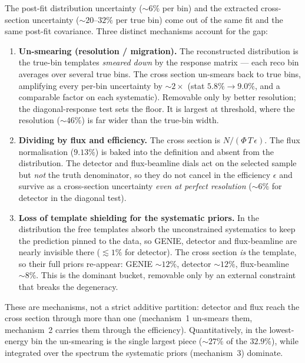 \documentclass[11pt]{article}
\begin{document}
The post-fit distribution uncertainty ($\sim\!6\%$ per bin) and the extracted
cross-section uncertainty ($\sim\!20$--$32\%$ per true bin) come out of the same
fit and the same post-fit covariance. Three distinct mechanisms account for the
gap:

\begin{enumerate}
  \item \textbf{Un-smearing (resolution / migration).} The reconstructed
    distribution is the true-bin templates \emph{smeared down} by the response
    matrix --- each reco bin averages over several true bins. The cross section
    un-smears back to true bins, amplifying every per-bin uncertainty by
    $\sim\!2\times$ (stat $5.8\%\to9.0\%$, and a comparable factor on each
    systematic). Removable only by better resolution; the diagonal-response test
    sets the floor. It is largest at threshold, where the resolution
    ($\sim\!46\%$) is far wider than the true-bin width.
  \item \textbf{Dividing by flux and efficiency.} The cross section is
    $N/(\Phi\,T\,\epsilon)$. The flux normalisation ($9.13\%$) is baked into the
    definition and absent from the distribution. The detector and flux-beamline
    dials act on the selected sample but \emph{not} the truth denominator, so
    they do not cancel in the efficiency $\epsilon$ and survive as a
    cross-section uncertainty \emph{even at perfect resolution} ($\sim\!6\%$ for
    detector in the diagonal test).
  \item \textbf{Loss of template shielding for the systematic priors.} In the
    distribution the free templates absorb the unconstrained systematics to keep
    the prediction pinned to the data, so GENIE, detector and flux-beamline are
    nearly invisible there ($\lesssim\!1\%$ for detector). The cross section
    \emph{is} the template, so their full priors re-appear: GENIE $\sim\!12\%$,
    detector $\sim\!12\%$, flux-beamline $\sim\!8\%$. This is the dominant
    bucket, removable only by an external constraint that breaks the degeneracy.
\end{enumerate}

These are mechanisms, not a strict additive partition: detector and flux reach
the cross section through more than one (mechanism~1 un-smears them, mechanism~2
carries them through the efficiency). Quantitatively, in the lowest-energy bin
the un-smearing is the single largest piece ($\sim\!27\%$ of the $32.9\%$),
while integrated over the spectrum the systematic priors (mechanism~3) dominate.
\end{document}
